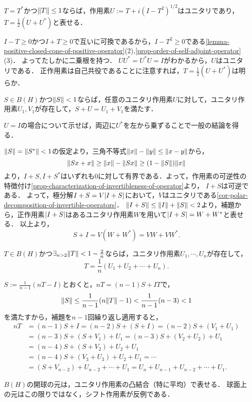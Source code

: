\documentclass[uplatex,dvipdfmx]{jsreport}
\begin{document}
\begin{lemma}[単位球内の自己共役作用素の表示]
    $T=T^*$かつ$\|T\|\le 1$ならば，作用素$U:=T+i(I-T^2)^{1/2}$はユニタリであり，$T=\frac{1}{2}(U+U^*)$と表せる．
\end{lemma}
\begin{Proof}
    $I-T\ge0$かつ$I+T\ge0$で互いに可換であるから，$I-T^2\ge0$である\ref{lemma-positive-closed-cone-of-positive-operator}(2),\ref{prop-order-of-self-adjoint-operator}(3)．
    よってたしかに二乗根を持つ．
    $UU^*=U^*U=I$がわかるから，$U$はユニタリである．
    正作用素は自己共役であることに注意すれば，$T=\frac{1}{2}(U+U^*)$は明らか．
\end{Proof}

\begin{lemma}
    $S\in B(H)$かつ$\|S\|<1$ならば，任意のユニタリ作用素$U$に対して，ユニタリ作用素$U_1,V_1$が存在して，$S+U=U_1+V_1$を満たす．
\end{lemma}
\begin{Proof}
    $U=I$の場合について示せば，両辺に$U^*$を左から乗ずることで一般の結論を得る．

    $\|S\|=\|S^*\|<1$の仮定より，三角不等式$\|x\|-\|y\|\le\|x-y\|$から，
    \[\|Sx+x\|\ge\|x\|-\|Sx\|\ge(1-\|S\|)\|x\|\]
    より，$I+S,I+S^*$はいずれも$0$に対して有界である．よって，作用素の可逆性の特徴付け\ref{prop-characterization-of-invertibleness-of-operator}より，
    $I+S$は可逆である．
    よって，極分解$I+S=V\lvert I+S\rvert$において，$V$はユニタリである\ref{cor-polar-decomposition-of-invertible-operators}．
    $\|I+S\|\le\|I\|+\|S\|<2$より，補題から，正作用素$\lvert I+S\rvert$はあるユニタリ作用素$W$を用いて$\lvert I+S\rvert=W+W^*$と表せる．
    以上より，
    \[S+I=V(W+W^*)=VW+VW^*.\]
\end{Proof}

\begin{proposition}
    $T\in B(H)$かつ$\exists_{n>2}\|T\|<1-\frac{2}{n}$ならば，ユニタリ作用素$U_1,\cdots,U_n$が存在して，
    \[T=\frac{1}{n}(U_1+U_2+\cdots+U_n).\]
\end{proposition}
\begin{Proof}
    $S:=\frac{1}{n-1}(nT-I)$とおくと，$nT=(n-1)S+IT$で，
    \[\|S\|\le\frac{1}{n-1}(n\|T\|-1)<\frac{1}{n-1}(n-3)<1\]
    を満たすから，補題を$n-1$回繰り返し適用すると，
    \begin{align*}
        nT&=(n-1)S+I=(n-2)S+(S+I)=(n-2)S+(V_1+U_1)\\
        &=(n-3)S+(S+V_1)+U_1=(n-3)S+(V_2+U_2)+U_1\\
        &=(n-4)S+(S+V_2)+U_2+U_1\\
        &=(n-4)S+(V_3+U_3)+U_2+U_1=\cdots\\
        &=(S+V_{n-2})+U_{n-2}+\cdots+U_1=U_n+U_{n-1}+U_{n-2}+\cdots+U_1.
    \end{align*}
\end{Proof}
\begin{remarks}
    $B(H)$の開球の元は，ユニタリ作用素の凸結合（特に平均）で表せる．
    球面上の元はこの限りではなく，シフト作用素が反例である．
\end{remarks}
\end{document}
